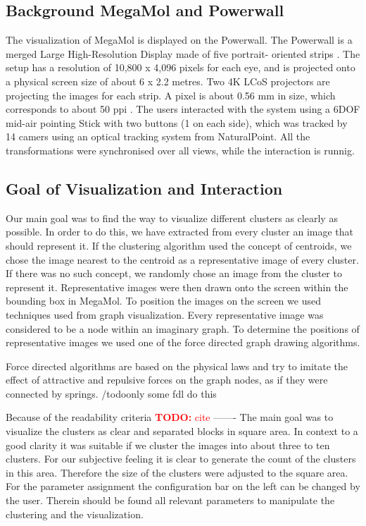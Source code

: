\documentclass[journal]{vgtc}       %
\newcommand{\todo}[1]{\textcolor{red}{\textbf{TODO:} #1}}
\begin{document}
\subsection{Background MegaMol and Powerwall}


The visualization of MegaMol is displayed on the Powerwall.
The  Powerwall is a merged Large High-Resolution Display made of five portrait- oriented
strips . The setup has  a resolution of 10,800 x 4,096 pixels
for each eye, and is projected onto a physical screen size of about 6 x 2.2 metres. 
Two 4K LCoS projectors are projecting
the images for each strip.
A pixel is about 0.56 mm  in size, which corresponds to about 50 ppi .
The users interacted with the system using a 6DOF mid-air
pointing Stick with two buttons (1 on each side), which was tracked by 14 camers
using an optical tracking system from NaturalPoint. 
All the transformations were synchronised over all views, while the interaction is runnig.




\subsection{Goal of Visualization and Interaction}
Our main goal was to find the way to visualize different clusters as clearly as possible. In order to do this, we have extracted from every cluster an image that should represent it. If the clustering algorithm used the concept of centroids, we chose the image nearest to the centroid as a representative image of every cluster. If there was no such concept, we randomly chose an image from the cluster to represent it. 
Representative images were then drawn onto the screen within the bounding box in MegaMol.
To position the images on the screen we used techniques used from graph visualization. Every representative image was considered to be a node within an imaginary graph. To determine the positions of representative images we used one of the force directed graph drawing algorithms. 

Force directed algorithms are based on the physical laws and try to imitate the effect of attractive and repulsive forces on the graph nodes, as if they were connected by springs. /todo{only some fdl do this}


Because of the readability criteria \todo{cite}
-------
The main goal was to visualize the clusters as clear and separated blocks in square area. In context to a good clarity it was suitable if we cluster the images into about three to ten clusters. For our subjective feeling it is clear to generate the count of the clusters in this area. Therefore the size of the clusters were adjusted to the square area. For the parameter assignment the configuration bar on the left can be changed by the user. Therein should be found all relevant parameters to manipulate the clustering and the visualization.
\end{document}
